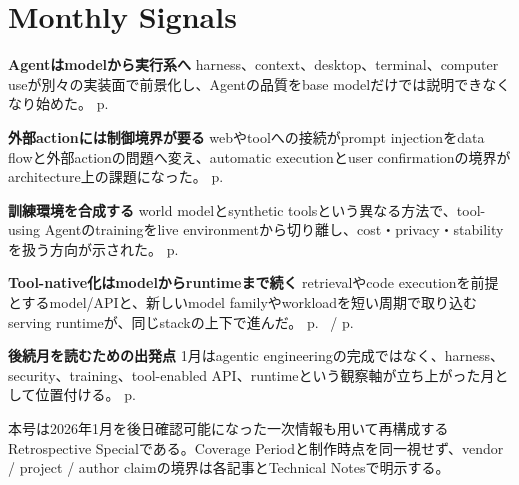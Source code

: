 \section*{Monthly Signals}
\smallskip
\noindent\textbf{Agentはmodelから実行系へ} harness、context、desktop、terminal、computer useが別々の実装面で前景化し、Agentの品質をbase modelだけでは説明できなくなり始めた。 \hfill{\footnotesize p.~\pageref{pkg:agent-stack-leaves-chat}}\par
\smallskip
\noindent\textbf{外部actionには制御境界が要る} webやtoolへの接続がprompt injectionをdata flowと外部actionの問題へ変え、automatic executionとuser confirmationの境界がarchitecture上の課題になった。 \hfill{\footnotesize p.~\pageref{pkg:autonomy-needs-guardrails}}\par
\smallskip
\noindent\textbf{訓練環境を合成する} world modelとsynthetic toolsという異なる方法で、tool-using Agentのtrainingをlive environmentから切り離し、cost・privacy・stabilityを扱う方向が示された。 \hfill{\footnotesize p.~\pageref{pkg:training-agents-offline}}\par
\smallskip
\noindent\textbf{Tool-native化はmodelからruntimeまで続く} retrievalやcode executionを前提とするmodel/APIと、新しいmodel familyやworkloadを短い周期で取り込むserving runtimeが、同じstackの上下で進んだ。 \hfill{\footnotesize p.~\pageref{pkg:tool-native-models} / p.~\pageref{pkg:runtime-catches-the-agent-wave}}\par
\smallskip
\noindent\textbf{後続月を読むための出発点} 1月はagentic engineeringの完成ではなく、harness、security、training、tool-enabled API、runtimeという観察軸が立ち上がった月として位置付ける。 \hfill{\footnotesize p.~\pageref{pkg:closing-synthesis}}\par
\medskip
\begin{claimboundary}
本号は2026年1月を後日確認可能になった一次情報も用いて再構成するRetrospective Specialである。Coverage Periodと制作時点を同一視せず、vendor / project / author claimの境界は各記事とTechnical Notesで明示する。
\end{claimboundary}
\medskip
\tableofcontents
